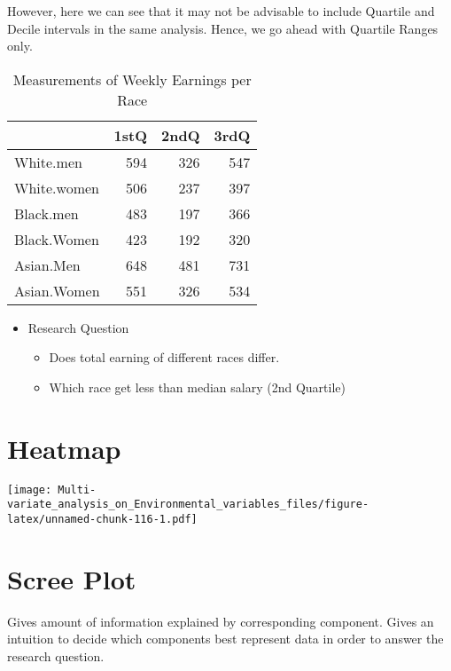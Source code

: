 \documentclass[]{book}
\providecommand{\tightlist}{%
  \setlength{\itemsep}{0pt}\setlength{\parskip}{0pt}}
\begin{document}
However, here we can see that it may not be advisable to include
Quartile and Decile intervals in the same analysis. Hence, we go ahead
with Quartile Ranges only.

\begin{table}

\caption{\label{tab:nice-tab-ca}Measurements of Weekly Earnings per Race}
\centering
\begin{tabular}[t]{lrrr}
\toprule
  & 1stQ & 2ndQ & 3rdQ\\
\midrule
White.men & 594 & 326 & 547\\
White.women & 506 & 237 & 397\\
Black.men & 483 & 197 & 366\\
Black.Women & 423 & 192 & 320\\
Asian.Men & 648 & 481 & 731\\
Asian.Women & 551 & 326 & 534\\
\bottomrule
\end{tabular}
\end{table}

\begin{itemize}
\item
  Research Question

  \begin{itemize}
  \tightlist
  \item
    Does total earning of different races differ.
  \item
    Which race get less than median salary (2nd Quartile)
  \end{itemize}
\end{itemize}

\hypertarget{heatmap-3}{%
\section{Heatmap}\label{heatmap-3}}

\texttt{[image: Multi-variate\_analysis\_on\_Environmental\_variables\_files/figure-latex/unnamed-chunk-116-1.pdf]}

\hypertarget{scree-plot-6}{%
\section{Scree Plot}\label{scree-plot-6}}

Gives amount of information explained by corresponding component. Gives
an intuition to decide which components best represent data in order to
answer the research question.
\end{document}

